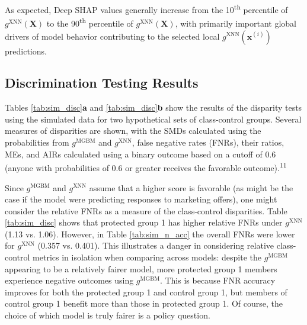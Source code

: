 \documentclass[information,article,submit,moreauthors,pdftex]{definitions/mdpi}
\begin{document}
\noindent As expected, Deep SHAP values generally increase from the 10\textsuperscript{th} percentile of $g^\text{XNN}(\mathbf{X})$ to the 90\textsuperscript{th} percentile of $g^\text{XNN}(\mathbf{X})$, with primarily important global drivers of model behavior contributing to the selected local $g^\text{XNN}(\mathbf{x}^{(i)})$ predictions.

\subsection{Discrimination Testing Results}\label{ssec:dis_sim}

Tables \ref{tab:sim_disc}\textbf{a} and \ref{tab:sim_disc}\textbf{b} show the results of the disparity tests using the simulated data for two hypothetical sets of class-control groups.  Several measures of disparities are shown, with the SMDs calculated using the probabilities from $g^{\text{MGBM}}$ and  $g^{\text{XNN}}$, false negative rates (FNRs), their ratios, MEs, and AIRs calculated using a binary outcome based on a cutoff of 0.6 (anyone with probabilities of 0.6 or greater receives the favorable outcome).\textsuperscript{11}

Since $g^{\text{MGBM}}$ and $g^{\text{XNN}}$ assume that a higher score is favorable (as might be the case if the model were predicting responses to marketing offers), one might consider the relative FNRs as a measure of the class-control disparities. Table \ref{tab:sim_disc} shows that protected group 1 has higher relative FNRs under $g^{\text{XNN}}$ (1.13 vs. 1.06).  However, in Table \ref{tab:sim_n_acc} the overall FNRs were lower for  $g^{\text{XNN}}$ (0.357 vs. 0.401). This illustrates a danger in considering relative class-control metrics in isolation when comparing across models: despite the $g^\text{MGBM}$ appearing to be a relatively fairer model, more protected group 1 members experience negative outcomes using $g^{\text{MGBM}}$. This is because FNR accuracy improves for both the protected group 1 and control group 1, but members of control group 1 benefit more than those in protected group 1.  Of course, the choice of which model is truly fairer is a policy question.
\end{document}
